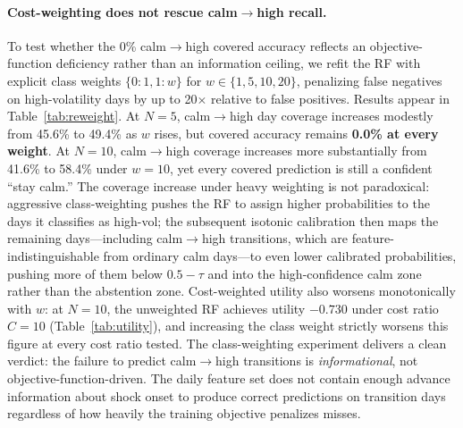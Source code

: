 \documentclass[11pt]{article}
\begin{document}
\paragraph{Cost-weighting does not rescue calm$\to$high recall.}
To test whether the 0\% calm$\to$high covered accuracy reflects an objective-function deficiency rather than an information ceiling, we refit the RF with explicit class weights $\{0{:}1, 1{:}w\}$ for $w \in \{1, 5, 10, 20\}$, penalizing false negatives on high-volatility days by up to 20$\times$ relative to false positives. Results appear in Table~\ref{tab:reweight}. At $N = 5$, calm$\to$high day coverage increases modestly from 45.6\% to 49.4\% as $w$ rises, but covered accuracy remains \textbf{0.0\% at every weight}. At $N = 10$, calm$\to$high coverage increases more substantially from 41.6\% to 58.4\% under $w = 10$, yet every covered prediction is still a confident ``stay calm.'' The coverage increase under heavy weighting is not paradoxical: aggressive class-weighting pushes the RF to assign higher probabilities to the days it classifies as high-vol; the subsequent isotonic calibration then maps the remaining days---including calm$\to$high transitions, which are feature-indistinguishable from ordinary calm days---to even lower calibrated probabilities, pushing more of them below $0.5 - \tau$ and into the high-confidence calm zone rather than the abstention zone. Cost-weighted utility also worsens monotonically with $w$: at $N = 10$, the unweighted RF achieves utility $-0.730$ under cost ratio $C = 10$ (Table~\ref{tab:utility}), and increasing the class weight strictly worsens this figure at every cost ratio tested. The class-weighting experiment delivers a clean verdict: the failure to predict calm$\to$high transitions is \emph{informational}, not objective-function-driven. The daily feature set does not contain enough advance information about shock onset to produce correct predictions on transition days regardless of how heavily the training objective penalizes misses.
\end{document}
